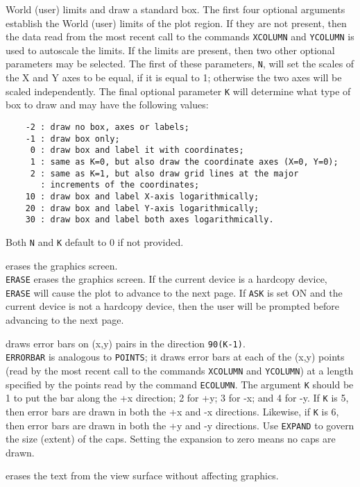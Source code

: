 	World (user) limits and draw a standard box.  The first four
	optional arguments establish the World (user) limits of the plot
	region.  If they are not present, then the data read from the most
	recent call to the commands {\tt XCOLUMN}
	and {\tt YCOLUMN} is used to autoscale
	the limits.  If the limits are present, then two other optional
	parameters may be selected.  The first of these parameters,
	{\tt N}, will set the scales of the X and Y axes to be equal,
	if it is equal to 1; otherwise the two axes will be scaled
	independently.  The final optional parameter {\tt K} will
	determine what type of box to draw and may have the following values:
	\begin{verbatim}
    -2 : draw no box, axes or labels;
    -1 : draw box only;
     0 : draw box and label it with coordinates;
     1 : same as K=0, but also draw the coordinate axes (X=0, Y=0);
     2 : same as K=1, but also draw grid lines at the major
       : increments of the coordinates;
    10 : draw box and label X-axis logarithmically;
    20 : draw box and label Y-axis logarithmically;
    30 : draw box and label both axes logarithmically.
	\end{verbatim}
	Both {\tt N} and {\tt K} default to 0 if not provided.
\item [{\tt ERASE } --] erases the graphics screen.\\
	{\tt ERASE} erases the graphics screen.  If the current
	device is a hardcopy device, {\tt ERASE} will cause the
	plot to advance to the next page.  If {\tt ASK}
	is set ON and the current device is not a hardcopy device, then the
	user will be prompted before advancing to the next page.
\item [{\tt ERRORBAR K } --] draws error bars on (x,y) pairs in the direction {\tt 90(K-1)}.\\
	{\tt ERRORBAR} is analogous to
	{\tt POINTS}; it draws error bars at
	each of the (x,y) points (read by the most recent call to the
	commands {\tt XCOLUMN} and
	{\tt YCOLUMN}) at a length specified
	by the points read by the command
	{\tt ECOLUMN}.  The argument {\tt K}
	should be 1 to put the bar along the +x direction; 2 for +y;
	3 for -x; and 4 for -y.  If {\tt K} is 5, then error bars
	are drawn in both the +x and -x directions.
	Likewise, if {\tt K} is 6, then error bars
	are drawn in both the +y and -y directions.
	Use {\tt EXPAND}
	to govern the size (extent) of the caps.
	Setting the expansion to zero means no caps are drawn.
\item [{\tt ETXT } --] erases the text from the view surface without affecting graphics.\\

